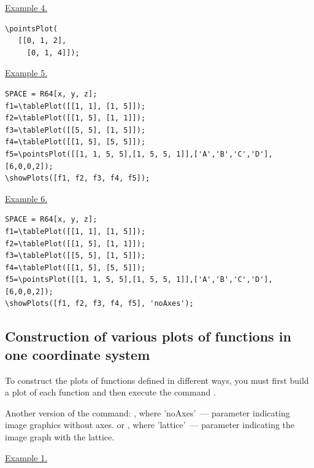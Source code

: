 \underline{Example 4.}
 
 \vspace*{-2mm}

\begin{verbatim}
\pointsPlot(
   [[0, 1, 2],
     [0, 1, 4]]);
\end{verbatim}

\underline{Example 5.}
 
 \vspace*{-2mm}

\begin{verbatim}
SPACE = R64[x, y, z];
f1=\tablePlot([[1, 1], [1, 5]]);
f2=\tablePlot([[1, 5], [1, 1]]);
f3=\tablePlot([[5, 5], [1, 5]]);
f4=\tablePlot([[1, 5], [5, 5]]);
f5=\pointsPlot([[1, 1, 5, 5],[1, 5, 5, 1]],['A','B','C','D'],[6,0,0,2]);
\showPlots([f1, f2, f3, f4, f5]);
\end{verbatim}

\underline{Example 6.}
 
 \vspace*{-2mm}

\begin{verbatim}
SPACE = R64[x, y, z];
f1=\tablePlot([[1, 1], [1, 5]]);
f2=\tablePlot([[1, 5], [1, 1]]);
f3=\tablePlot([[5, 5], [1, 5]]);
f4=\tablePlot([[1, 5], [5, 5]]);
f5=\pointsPlot([[1, 1, 5, 5],[1, 5, 5, 1]],['A','B','C','D'],[6,0,0,2]);
\showPlots([f1, f2, f3, f4, f5], 'noAxes');
\end{verbatim}

\subsection{Construction of various plots of functions in one coordinate system}
To construct the plots of functions defined in different ways, you must first build a plot of each function and then execute the command  
.

Another version of the command:
, where 'noAxes'~--- parameter indicating image graphics without axes.
or
, where 'lattice'~--- parameter indicating the image graph with the lattice.

\underline{Example 1.}
 
 \vspace*{-2mm}

